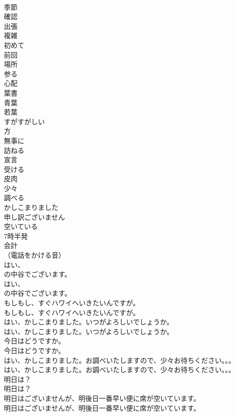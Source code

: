 \documentclass[8pt]{extreport}
\begin{document}
\begin{CJK}{UTF8}{min}
\\	季節
\\	確認
\\	出張
\\	複雑
\\	初めて
\\	前回
\\	場所
\\	参る
\\	心配
\\	葉書
\\	青葉
\\	若葉
\\	すがすがしい
\\	方
\\	無事に
\\	訪ねる
\\	宣言
\\	受ける
\\	皮肉
\\	少々
\\	調べる
\\	かしこまりました
\\	申し訳ございません
\\	空いている
\\	7時半発
\\	会計
\\	（電話をかける音）	
\\	はい、
\\	の中谷でございます。	
\\	はい、
\\	の中谷でございます。 
\\	もしもし、すぐハワイへいきたいんですが。	
\\	もしもし、すぐハワイへいきたいんですが。 
\\	はい、かしこまりました。いつがよろしいでしょうか。	
\\	はい、かしこまりました。いつがよろしいでしょうか。 
\\	今日はどうですか。	
\\	今日はどうですか。 
\\	はい、かしこまりました。お調べいたしますので、少々お待ちください。。。	
\\	はい、かしこまりました。お調べいたしますので、少々お待ちください。。。 
\\	明日は？	
\\	明日は？ 
\\	明日はございませんが、明後日一番早い便に席が空いています。	
\\	明日はございませんが、明後日一番早い便に席が空いています。 

\end{CJK}
\end{document}
